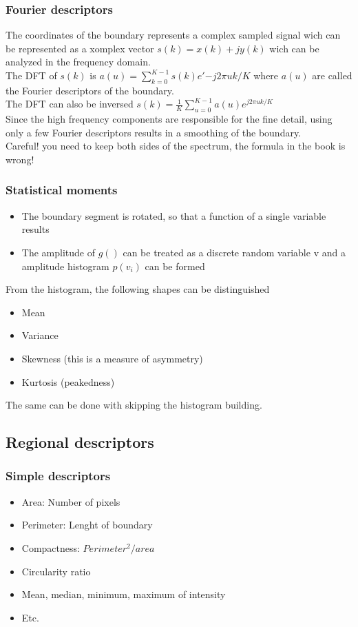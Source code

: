 \subsubsection{Fourier descriptors}
The coordinates of the boundary represents a complex sampled signal wich can be represented as a xomplex vector $s(k)=x(k)+jy(k)$ wich can be analyzed in the frequency domain.\\
The DFT of $s(k)$ is $a(u)=\sum\limits_{k=0}^{K-1}s(k)e'{-j2\pi uk/K}$ where $a(u)$ are called the Fourier descriptors of the boundary.\\
The DFT can also be inversed $s(k)=\frac{1}{K}\sum\limits_{u=0}^{K-1}a(u)e^{j2\pi uk/K}$\\
Since the high frequency components are responsible for the fine detail, using only a few Fourier descriptors results in a smoothing of the boundary.\\
Careful! you need to keep both sides of the spectrum, the formula in the book is wrong!\\
\subsubsection{Statistical moments}
\begin{itemize}
\item The boundary segment is rotated, so that a function of a single variable results
\item The amplitude of $g()$ can be treated as a discrete random variable v and a amplitude histogram $p(v_i)$ can be formed
\end{itemize}
From the histogram, the following shapes can be distinguished
\begin{itemize}
\item Mean
\item Variance
\item Skewness (this is a measure of asymmetry)
\item Kurtosis (peakedness)
\end{itemize}
The same can be done with skipping the histogram building.

\subsection{Regional descriptors}
\subsubsection{Simple descriptors}
\begin{itemize}
\item Area: Number of pixels
\item Perimeter: Lenght of boundary
\item Compactness: $Perimeter^2/area$
\item Circularity ratio
\item Mean, median, minimum, maximum of intensity
\item Etc.
\end{itemize}
